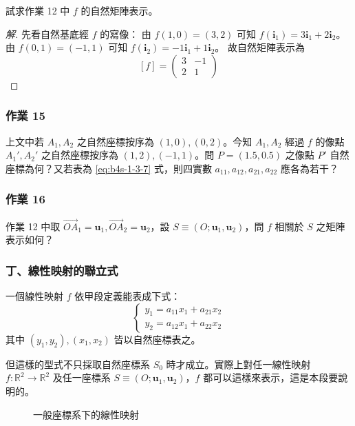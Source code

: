 \begin{example}[例 5]
試求作業 12 中 $f$ 的自然矩陣表示。
\end{example}

\begin{proof}[解]
先看自然基底經 $f$ 的寫像：
由 $f(1, 0) = (3, 2)$ 可知 $f(\mathbf{i}_1) = 3\mathbf{i}_1 + 2\mathbf{i}_2$。
由 $f(0, 1) = (-1, 1)$ 可知 $f(\mathbf{i}_2) = -1\mathbf{i}_1 + 1\mathbf{i}_2$。
故自然矩陣表示為
\[ [f] = \begin{pmatrix} 3 & -1 \\ 2 & 1 \end{pmatrix} \]
\end{proof}

\subsubsection*{作業 15}
上文中若 $A_1, A_2$ 之自然座標按序為 $(1, 0), (0, 2)$。今知 $A_1, A_2$ 經過 $f$ 的像點 $A_1', A_2'$ 之自然座標按序為 $(1, 2), (-1, 1)$。問 $P = (1.5, 0.5)$ 之像點 $P'$ 自然座標為何？又若表為 \eqref{eq:b4s-1-3-7} 式，則四實數 $a_{11}, a_{12}, a_{21}, a_{22}$ 應各為若干？

\subsubsection*{作業 16}
作業 12 中取 $\vec{OA}_1 = \mathbf{u}_1, \vec{OA}_2 = \mathbf{u}_2$，設 $S \equiv (O; \mathbf{u}_1, \mathbf{u}_2)$，問 $f$ 相關於 $S$ 之矩陣表示如何？

\subsubsection*{丁、線性映射的聯立式}

一個線性映射 $f$ 依甲段定義能表成下式：
\begin{equation}
\begin{cases}
y_1 = a_{11}x_1 + a_{21}x_2 \\
y_2 = a_{12}x_1 + a_{22}x_2
\end{cases} \label{eq:b4s-1-3-9}
\end{equation}
其中 $(y_1, y_2), (x_1, x_2)$ 皆以自然座標表之。

但這樣的型式不只採取自然座標系 $S_0$ 時才成立。實際上對任一線性映射 $f: \mathbb{R}^2 \to \mathbb{R}^2$ 及任一座標系 $S \equiv (O; \mathbf{u}_1, \mathbf{u}_2)$，$f$ 都可以這樣來表示，這是本段要說明的。

\begin{figure}[H]
\centering
{}
\caption{一般座標系下的線性映射}
\label{fig:b4s-1-3-6}
\end{figure}

